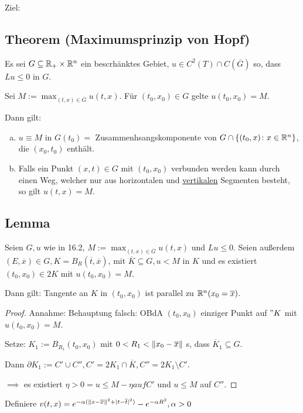 Ziel:

\subsection{Theorem (Maximumsprinzip von Hopf)}

Es sei $G \subseteq \mathbb{R}_+ \times \mathbb{R}^n$ ein bescrhänktes Gebiet, $u \in C^2(T) \cap C(\overline G)$ so, dass $Lu \leq 0$ in $G$.

Sei $M := \max_{(t,x) \in \overline G} u(t,x)$.
Für $(t_0, x_0) \in G$ gelte $u(t_0, x_0) = M$.

Dann gilt:
\begin{enumerate}[a)]
  \item $ u \equiv M$ in $G(t_0) = $ Zusammenhsangskomponente von $G \cap \{(t_0, x) \colon x \in \mathbb{R}^n\}$, die $(x_0, t_0)$ enthält.
  \item Falls ein Punkt $(x,t) \in G$ mit $(t_0, x_0)$ verbunden werden kann durch einen Weg, welcher nur aus horizontalen und \underline{vertikalen} Segmenten besteht, so gilt $u(t,x) = M$.
\end{enumerate}

\subsection{Lemma}

Seien $G, u$ wie in 16.2, $M := \max_{(t,x) \in \overline G} u(t,x)$ und $L u \leq 0$. Seien außerdem $(E, \overline x) \in G, K = B_R(\overline t, \overline x)$, mit $\overline K \subseteq G, u < M$ in $K$ und es existiert $(t_0, x_0) \in 2K$ mit $u(t_0, x_0) = M.$

Dann gilt: Tangente an $K$ in $(t_0, x_0)$ ist parallel zu $\mathbb{R}^n (x_0 = \overline x)$.

\begin{proof}
  Annahme: Behauptung falsch: OBdA $(t_0, x_0)$ einziger Punkt auf $"K$ mit $u(t_0, x_0) = M$.

  Setze: $K_1 := B_{R_1}(t_0, x_0)$ mit $0 < R_1 < \lVert x_0 - \overline x \rVert$ s, dass $\overline K_1 \subseteq G$. 

  Dann $\partial K_1 := C' \cup C'', C' = 2K_1 \cap \overline K, C'' = 2K_1 \setminus C'$.

  $\implies $ es existiert $\eta > 0 = u \leq M - \eta auf C'$ und $u \leq M$ auf $C''$.
\end{proof}

Definiere $v(t,x) = e^{-\alpha(\lVert x - \overline x \rVert^2 + |t - \overline t|^2)} - e^{-\alpha R^2}, \alpha > 0 $

